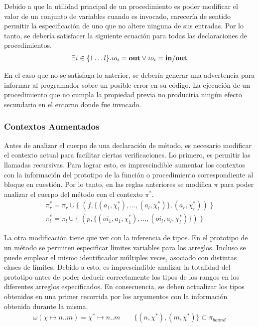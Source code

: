 \documentclass{article}
\begin{document}
Debido a que la utilidad principal de un procedimiento es poder modificar el valor de un conjunto de variables cuando es invocado, carecería de sentido permitir la especificación de uno que no altere ninguna de sus entradas.
Por lo tanto, se debería satisfacer la siguiente ecuación para todas las declaraciones de procedimientos.
\begin{gather*}
\exists i \in \{ 1 \ldots l\}. io_i = \mathbf{out} \vee io_i = \mathbf{in/out}
\end{gather*}

En el caso que no se satisfaga lo anterior, se debería generar una advertencia para informar al programador sobre un posible error en su código.
La ejecución de un procedimiento que no cumpla la propiedad previa no produciría ningún efecto secundario en el entorno donde fue invocado.

\subsubsection{Contextos Aumentados}

Antes de analizar el cuerpo de una declaración de método, es necesario modificar el contexto actual para facilitar ciertas verificaciones.
Lo primero, es permitir las llamadas recursivas.
Para lograr esto, es imprescindible aumentar los contextos con la información del prototipo de la función o procedimiento correspondiente al bloque en cuestión.
Por lo tanto, en las reglas anteriores se modifica $\pi$ para poder analizar el cuerpo del método con el contexto $\pi^*$.
\begin{gather*}
\pi^*_r = \pi_r \cup
\{ \; (f, \{ (a_1, \chi^*_1), \ldots, (a_l, \chi^*_l) \}, (a_r, \chi^*_r)) \; \}
\\
\pi^*_l = \pi_l \cup
\{ \; (p, \{ (oi_1, a_1, \chi^*_1), \ldots, (oi_l, a_l, \chi^*_l) \}) \; \}
\end{gather*}

La otra modificación tiene que ver con la inferencia de tipos.
En el prototipo de un método se permiten especificar límites variables para los arreglos.
Incluso se puede emplear el mismo identificador múltiples veces, asociado con distintas clases de límites.
Debido a esto, es imprescindible analizar la totalidad del prototipo antes de poder deducir correctamente los tipos de los rangos en los diferentes arreglos especificados.
En consecuencia, se deben actualizar los tipos obtenidos en una primer recorrida por los argumentos con la información obtenida durante la misma.
\begin{gather*}
\omega(\chi \mapsto n .. m) = \chi^* \mapsto n .. m \qquad \{ (n, \chi^*), (m, \chi^*) \} \subset \pi_{bound}
\end{gather*}
\end{document}
